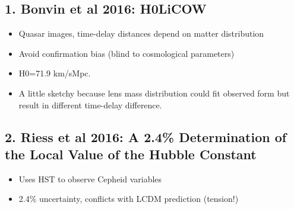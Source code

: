 \documentclass{article}
\begin{document}
\subsection*{1. Bonvin et al 2016: H0LiCOW}
\begin{itemize}
\item Quasar images, time-delay distances depend on matter distribution
\item Avoid confirmation bias (blind to cosmological parameters)
\item H0=71.9 km/sMpc.
\item A little sketchy because lens mass distribution could fit observed form but result in different time-delay difference.
\end{itemize}

\subsection*{2. Riess et al 2016: A 2.4\% Determination of the Local Value of the Hubble Constant}
\begin{itemize}
\item Uses HST to observe Cepheid variables
\item 2.4\% uncertainty, conflicts with LCDM prediction (tension!)
\end{itemize}
\end{document}

